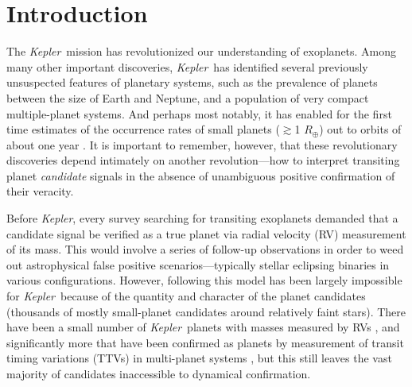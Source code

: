 \documentclass{emulateapj}
\newcommand{\kepler}{\textit{Kepler}}
\begin{document}


\keywords{}


\section{Introduction}

The \kepler\ mission has revolutionized our understanding of
exoplanets.  Among many other important discoveries, \kepler\ has
identified several previously unsuspected features of planetary
systems, such as the prevalence of planets between the size of Earth
and Neptune, and a population of very compact multiple-planet systems.
And perhaps most notably, it has enabled for the first time estimates
of the occurrence rates of small planets ($\gtrsim$1 $R_\oplus$) out
to orbits of about one year
\citep[e.g.][]{Petigura:2013,DFM:2014,Burke:2015}.  It is important to
remember, however, that these revolutionary discoveries depend
intimately on another revolution---how to interpret transiting planet
\textit{candidate} signals in the absence of unambiguous positive
confirmation of their veracity.

Before \kepler, every survey searching for transiting exoplanets
demanded that a candidate signal be verified as a true planet via
radial velocity (RV) measurement of its mass.  This would involve a
series of follow-up observations in order to weed out astrophysical
false positive scenarios---typically stellar eclipsing binaries in
various configurations.  However, following this model has been
largely impossible for \kepler\ because of the quantity and character
of the planet candidates (thousands of mostly small-planet candidates
around relatively faint stars).  There have been a small number of
\kepler\ planets with masses measured by RVs
\citep[e.g.,][]{Marcy:2014,Santerne:2015}, and significantly more that
have been confirmed as planets by measurement of transit timing
variations (TTVs) in multi-planet systems
\citep[e.g.,][]{Ford:2012,Steffen:2012,Fabrycky:2012,Steffen:2013,Jontof:2015},
but this still leaves the vast majority of candidates inaccessible to
dynamical confirmation.
\end{document}
